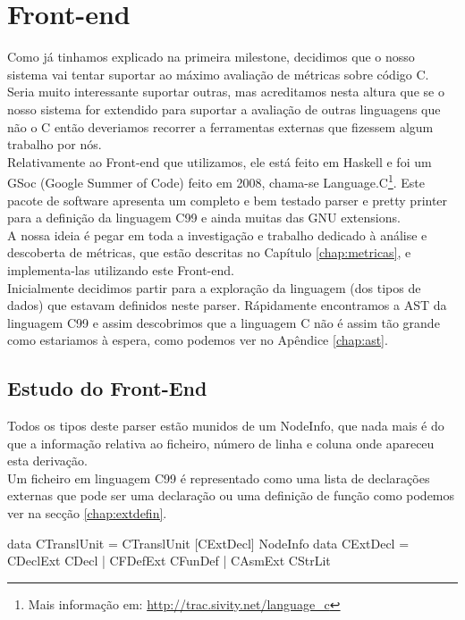 \chapter{Front-end}
\minitoc
Como já tinhamos explicado na primeira milestone, decidimos que o nosso sistema vai tentar suportar ao máximo avaliação de métricas sobre código C.
Seria muito interessante suportar outras, mas acreditamos nesta altura que se o nosso sistema for extendido para suportar a avaliação de outras linguagens que não o C
então deveriamos recorrer a ferramentas externas que fizessem algum trabalho por nós.\\
Relativamente ao Front-end que utilizamos, ele está feito em Haskell e foi um GSoc (Google Summer of Code) feito em 2008, chama-se Language.C\footnote{Mais informação em: \url{http://trac.sivity.net/language\_c}}.
Este pacote de software apresenta um completo e bem testado parser e pretty printer para a definição da linguagem \textrm{C99} e ainda muitas das \textrm{GNU extensions}.\\

A nossa ideia é pegar em toda a investigação e trabalho dedicado à análise e descoberta de métricas, que estão descritas no Capítulo \ref{chap:metricas}, e implementa-las
utilizando este Front-end.\\

Inicialmente decidimos partir para a exploração da linguagem (dos tipos de dados) que estavam definidos neste parser. Rápidamente encontramos a AST da linguagem \textrm{C99}
e assim descobrimos que a linguagem C não é assim tão grande como estariamos à espera, como podemos ver no Apêndice \ref{chap:ast}.

\section{Estudo do Front-End}\label{chap:frontend}
Todos os tipos deste parser estão munidos de um \textrm{NodeInfo}, que nada mais é do que a informação relativa ao ficheiro, número de linha e coluna onde apareceu
esta derivação.\\
Um ficheiro em linguagem \textrm{C99} é representado como uma lista de declarações externas que pode ser uma declaração ou uma definição de função como podemos ver
na secção \ref{chap:extdefin}.

\begin{haskell}
data CTranslUnit = CTranslUnit [CExtDecl] NodeInfo
data CExtDecl = CDeclExt CDecl
              | CFDefExt CFunDef
              | CAsmExt CStrLit
\end{haskell}

